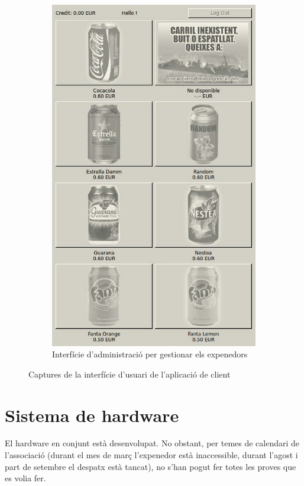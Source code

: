 \begin{figure}[H]
\begin{subfigure}[b]{0.45\textwidth}
		\includegraphics[width=\textwidth]{images/client_app2}
		\caption{Interfície d'administració per gestionar els expenedors}
		\label{fig:admin2}
	\end{subfigure}
	\caption{Captures de la interfície d'usuari de l'aplicació de client}
	\label{fig:intro-example}
\end{figure}

\section{Sistema de hardware}
El hardware en conjunt està desenvolupat. No obstant, per temes de calendari de l'associació (durant el mes de març l'expenedor està inaccessible, durant l'agost i part de setembre el despatx està tancat), no s'han pogut fer totes les proves que es volia fer.

